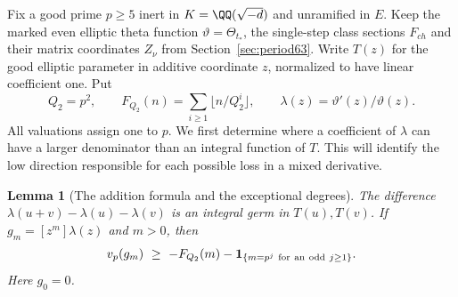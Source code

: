 \documentclass[a4paper,11pt]{article}
\newtheorem{lemma}[proposition]{Lemma}
\theoremstyle{definition}
\theoremstyle{remark}
\numberwithin{equation}{section}
\begin{document}
Fix a good prime \(p\ge5\) inert in \(K=\QQ(\sqrt{-d})\) and
unramified in \(E\). Keep the marked even elliptic theta function
\(\vartheta=\Theta_{t_*}\), the single-step class sections \(F_{ch}\)
and their matrix coordinates \(Z_\nu\) from Section~\ref{sec:period63}.
Write \(T(z)\) for the good elliptic parameter in additive coordinate
\(z\), normalized to have linear coefficient one. Put
\[
       Q_2=p^2,\qquad F_{Q_2}(n)=\sum_{i\ge1}\lfloor n/Q_2^i\rfloor,
       \qquad \lambda(z)=\vartheta'(z)/\vartheta(z).
\]
All valuations assign one to \(p\). We first determine where a
coefficient of \(\lambda\) can have a larger denominator than an
integral function of \(T\). This will identify the low direction
responsible for each possible loss in a mixed derivative.

\begin{lemma}[The addition formula and the exceptional degrees]
\leavevmode\label{lem:add76}
The difference \(\lambda(u+v)-\lambda(u)-\lambda(v)\) is an
integral germ in \(T(u),T(v)\). If \(g_m=[z^m]\lambda(z)\) and
\(m>0\), then
\begin{equation}
 v_p(g_m)\ \ge\ -F_{Q_2}(m)
         -\mathbf 1_{\{m=p^j\ {\rm for\ an\ odd}\ j\ge1\}} .
 \label{eq:add76}
\end{equation}
Here \(g_0=0\).
\end{lemma}
\end{document}
